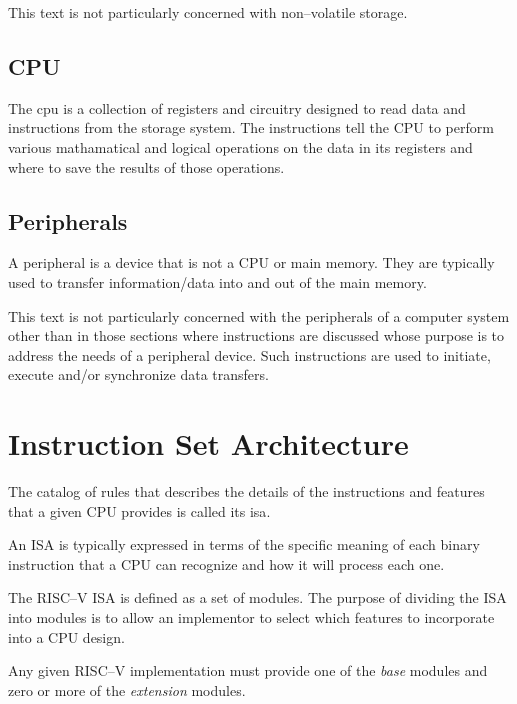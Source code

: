 This text is not particularly concerned with non--volatile storage. 

\subsection{CPU}

The \acrshort{cpu} is a collection of registers and circuitry designed
to read data and instructions from the storage system.  The instructions
tell the CPU to perform various mathamatical and logical operations on 
the data in its registers and where to save the results of those operations.

\subsection{Peripherals}

A peripheral is a device that is not a CPU or main memory.  They are 
typically used to transfer information/data into and out of the 
main memory.

This text is not particularly concerned with the peripherals of a computer
system other than in those sections where instructions are discussed 
whose purpose is to address the needs of a peripheral device.  Such
instructions are used to initiate, execute and/or synchronize data transfers.


\section{Instruction Set Architecture}

The catalog of rules that describes the details of the instructions 
and features that a given CPU provides is called its \acrfull{isa}.

An ISA is typically expressed in terms of the specific meaning of
each binary instruction that a CPU can recognize and how it will
process each one.

The RISC--V ISA is defined as a set of modules.  The purpose of
dividing the ISA into modules is to allow an implementor to select which 
features to incorporate into a CPU design.

Any given RISC--V implementation must provide one of the {\em base}
modules and zero or more of the {\em extension} modules.

